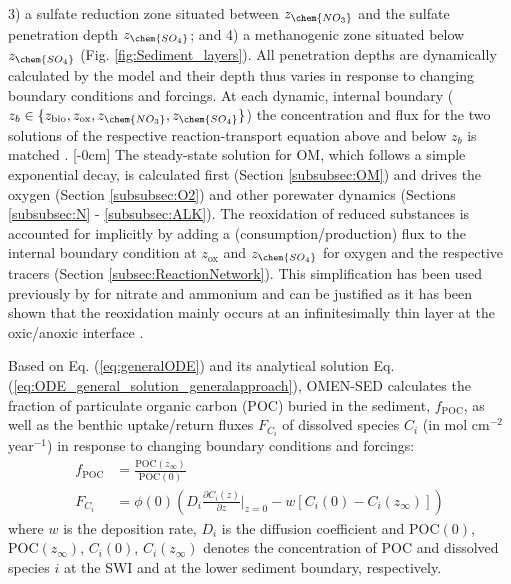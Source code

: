 \documentclass[gmd, manuscript]{copernicus}
\begin{document}
3) a sulfate reduction zone situated between $z_{\chem{NO_3}}$ and the sulfate penetration depth $z_{\chem{SO_4}}$; and 4) a methanogenic zone situated below $z_{\chem{SO_4}}$ (Fig. \ref{fig:Sediment_layers}).  
All penetration depths are dynamically calculated by the model and their depth thus varies in response to changing boundary conditions and forcings. 
At each dynamic, internal boundary ($z_b \in \{z_{\mathrm{bio}}, z_{\mathrm{ox}}, z_{\chem{NO_3}}, z_{\chem{SO_4}} \}$) the concentration and flux for the two solutions of the respective reaction-transport equation above and below 
$z_b$ is matched \citep[compare e.g.][and Section \ref{subsec:GBCM}]{billen1982idealized, gypens_simple_2008}. 
[-0cm]%
The steady-state solution for OM, which follows a simple exponential decay, is calculated first (Section \ref{subsubsec:OM}) and drives the oxygen (Section \ref{subsubsec:O2}) and 
other porewater dynamics (Sections \ref{subsubsec:N} - \ref{subsubsec:ALK}). 
The reoxidation of reduced substances is accounted for implicitly by adding a (consumption/production) flux to the internal boundary condition at $z_{\mathrm{ox}}$ and $z_\chem{SO_4}$ for oxygen and the respective tracers 
(Section \ref{subsec:ReactionNetwork}). This simplification has been used previously by \citet{gypens_simple_2008} for nitrate and ammonium and can be justified as it has been shown that the reoxidation mainly occurs at an 
infinitesimally thin layer at the oxic/anoxic interface \citep{soetaert_model_1996}. 


Based on Eq. (\ref{eq:generalODE}) and its analytical solution Eq. (\ref{eq:ODE_general_solution_generalapproach}), OMEN-SED calculates the fraction of particulate organic carbon (POC) buried in the sediment, 
$f_{\mathrm{POC}}$, as well as the benthic uptake/return fluxes $F_{C_i}$ of dissolved species $C_i$ (in mol cm$^{-2}$ year$^{-1}$) in response to changing boundary conditions and forcings:
\begin{align}
f_{\mathrm{POC}} &= \frac{\mathrm{POC}(z_\infty)}{\mathrm{POC}(0)} \\
F_{C_i} &= \phi(0) \left(D_i \frac{\partial C_i(z)}{\partial z}\bigg\rvert_{z=0} - w \left[ C_i(0) - C_i(z_\infty) \right]\right)
\end{align}
where $w$ is the deposition rate, $D_i$ is the diffusion coefficient and $\mathrm{POC}(0)$, $\mathrm{POC}(z_\infty)$, $C_i(0)$, $C_i(z_\infty)$ denotes the concentration of POC and dissolved species $i$ at the SWI and 
at the lower sediment boundary, respectively.
\end{document}
